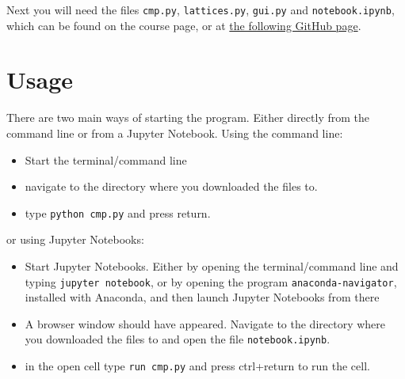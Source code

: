 \documentclass[a4paper,11pt]{article}
\numberwithin{equation}{section}
\begin{document}
	Next you will need the files \texttt{cmp.py}, \texttt{lattices.py}, \texttt{gui.py} and \texttt{notebook.ipynb}, which can be found on the course page, or at \href{https://github.com/NikolaiNielsen/Bachelor/tree/gui/release}{the following GitHub page}.
	
	\section{Usage}
	There are two main ways of starting the program. Either directly from the command line or from a Jupyter Notebook. Using the command line:
	\begin{itemize}
		\item Start the terminal/command line
		\item navigate to the directory where you downloaded the files to.
		\item type \texttt{python cmp.py} and press return.
	\end{itemize}
	or using Jupyter Notebooks:
	\begin{itemize}
		\item Start Jupyter Notebooks. Either by opening the terminal/command line and typing \texttt{jupyter notebook}, or by opening the program \texttt{anaconda-navigator}, installed with Anaconda, and then launch Jupyter Notebooks from there
		\item A browser window should have appeared. Navigate to the directory where you downloaded the files to and open the file \texttt{notebook.ipynb}.
		\item in the open cell type \texttt{run cmp.py} and press ctrl+return to run the cell.
	\end{itemize}
	
	
\end{document}
